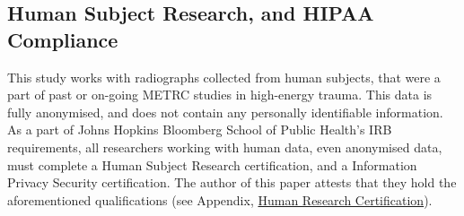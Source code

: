 \subsection{Human Subject Research, and HIPAA Compliance}
This study works with radiographs collected from human subjects, that were a part of past or on-going METRC studies in high-energy trauma. This data is fully anonymised, and does not contain any personally identifiable information. As a part of Johns Hopkins Bloomberg School of Public Health's IRB requirements, all researchers working with human data, even anonymised data, must complete a Human Subject Research certification, and a Information Privacy Security certification. The author of this paper attests that they hold the aforementioned qualifications (see Appendix, \hyperref[sec:compliance]{Human Research Certification}).